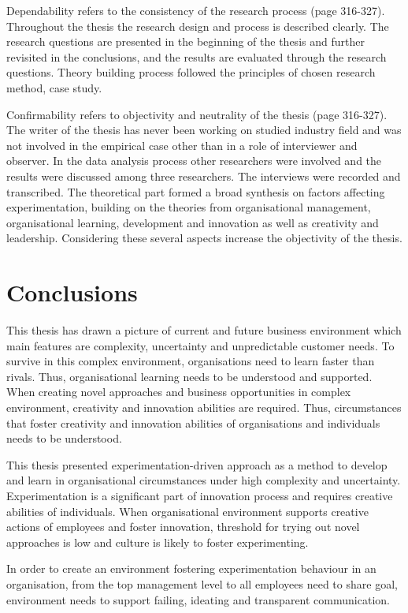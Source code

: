 Dependability refers to the consistency of the research process \citep{lincoln1985naturalistic} (page 316-327). Throughout the thesis the research design and process is described clearly. The research questions are presented in the beginning of the thesis and further revisited in the conclusions, and the results are evaluated through the research questions. 
Theory building process followed the principles of chosen research method, case study. 

Confirmability refers to objectivity and neutrality of the thesis \citep{lincoln1985naturalistic} (page 316-327). The writer of the thesis has never been working on studied industry field and was not involved in the empirical case other than in a role of interviewer and observer. In the data analysis process other researchers were involved and the results were discussed among three researchers. The interviews were recorded and transcribed. The theoretical part formed a broad synthesis on factors affecting experimentation, building on the theories from organisational management, organisational learning, development and innovation as well as creativity and leadership. Considering these several aspects increase the objectivity of the thesis. 

\chapter{Conclusions}
This thesis has drawn a picture of current and future business environment which main features are complexity, uncertainty and unpredictable customer needs. To survive in this complex environment, organisations need to learn faster than rivals. Thus, organisational learning needs to be understood and supported. When creating novel approaches and business opportunities in complex environment, creativity and innovation abilities are required. Thus, circumstances that foster creativity and innovation abilities of organisations and individuals needs to be understood. 

This thesis presented experimentation-driven approach as a method to develop and learn in organisational circumstances under high complexity and uncertainty. Experimentation is a significant part of innovation process and requires creative abilities of individuals. When organisational environment supports creative actions of employees and foster innovation, threshold for trying out novel approaches is low and culture is likely to foster experimenting. 

In order to create an environment fostering experimentation behaviour in an organisation, from the top management level to all employees need to share goal, environment needs to support failing, ideating and transparent communication. 
